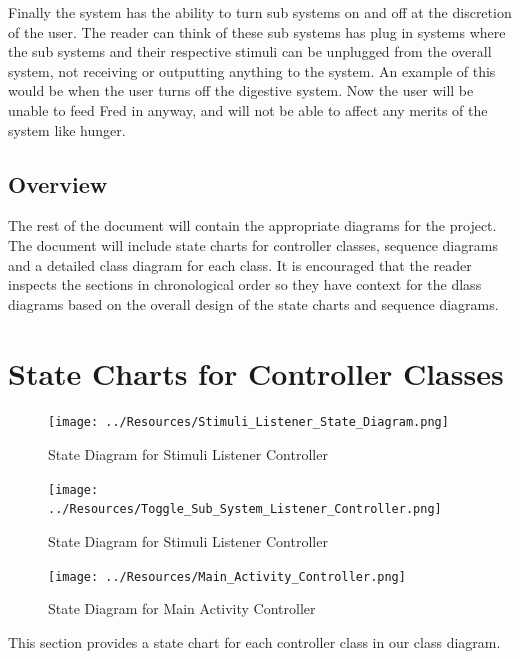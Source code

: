 \documentclass[]{article}
\begin{document}
Finally the system has the ability to turn sub systems on and off at the discretion of the user. The reader can think of these sub systems has plug in systems where the sub systems and their respective stimuli can be unplugged from the overall system, not receiving or outputting anything to the system. An example of this would be when the user turns off the digestive system. Now the user will be unable to feed Fred in anyway, and will not be able to affect any merits of the system like hunger.

\subsection{Overview}
\label{sub:overview}
The rest of the document will contain the appropriate diagrams for the project. The document will include state charts for controller classes, sequence diagrams and a detailed class diagram for each class. It is encouraged that the reader inspects the sections in chronological order so they have context for the dlass diagrams based on the overall design of the state charts and sequence diagrams.



\section{State Charts for Controller Classes}
\label{sec:state_charts_for_controller_classes}
\begin{figure}[H]
	\centering
	\texttt{[image: ../Resources/Stimuli\_Listener\_State\_Diagram.png]}
	\caption{State Diagram for Stimuli Listener Controller}
\end{figure}
\begin{figure}[H]
	\centering
	\texttt{[image: ../Resources/Toggle\_Sub\_System\_Listener\_Controller.png]}
	\caption{State Diagram for Stimuli Listener Controller}
\end{figure}
\begin{figure}[H]
	\centering
	\texttt{[image: ../Resources/Main\_Activity\_Controller.png]}
	\caption{State Diagram for Main Activity Controller}
\end{figure}

This section provides a state chart for each controller class in our class diagram.

\end{document}
